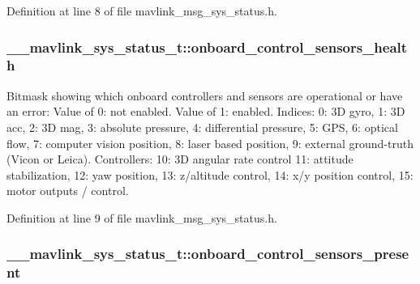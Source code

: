 Definition at line 8 of file mavlink\-\_\-msg\-\_\-sys\-\_\-status.\-h.

\hypertarget{struct____mavlink__sys__status__t_a8527d9f9e9517ee5a9dc7aba0235ace9}{
\subsubsection[{onboard\-\_\-control\-\_\-sensors\-\_\-health}]{ \-\_\-\-\_\-mavlink\-\_\-sys\-\_\-status\-\_\-t\-::onboard\-\_\-control\-\_\-sensors\-\_\-health}}\label{struct____mavlink__sys__status__t_a8527d9f9e9517ee5a9dc7aba0235ace9}


Bitmask showing which onboard controllers and sensors are operational or have an error\-: Value of 0\-: not enabled. Value of 1\-: enabled. Indices\-: 0\-: 3\-D gyro, 1\-: 3\-D acc, 2\-: 3\-D mag, 3\-: absolute pressure, 4\-: differential pressure, 5\-: G\-P\-S, 6\-: optical flow, 7\-: computer vision position, 8\-: laser based position, 9\-: external ground-\/truth (Vicon or Leica). Controllers\-: 10\-: 3\-D angular rate control 11\-: attitude stabilization, 12\-: yaw position, 13\-: z/altitude control, 14\-: x/y position control, 15\-: motor outputs / control. 



Definition at line 9 of file mavlink\-\_\-msg\-\_\-sys\-\_\-status.\-h.

\hypertarget{struct____mavlink__sys__status__t_a9c506f0a78266af5a1230eb1a0ca78b9}{
\subsubsection[{onboard\-\_\-control\-\_\-sensors\-\_\-present}]{ \-\_\-\-\_\-mavlink\-\_\-sys\-\_\-status\-\_\-t\-::onboard\-\_\-control\-\_\-sensors\-\_\-present}}\label{struct____mavlink__sys__status__t_a9c506f0a78266af5a1230eb1a0ca78b9}


